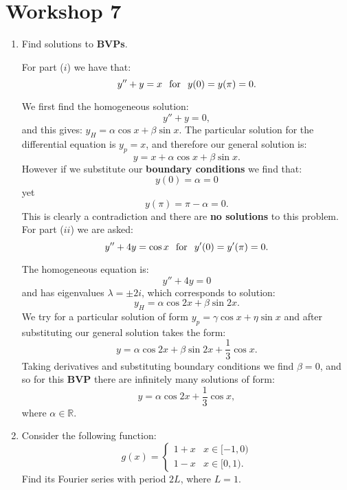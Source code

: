 \pagestyle{fancy}
\fancyhead{}

\section{Workshop 7}
\begin{enumerate}
    \item Find solutions to \textbf{BVPs}.

    For part ($i$) we have that:
    $$y''+y=x\hspace{0.1in}\text{for}\hspace{0.1in}y(0)=y(\pi)=0.$$
    
    We first find the homogeneous solution:
    $$y''+y=0,$$
    and this gives:
    $y_H=\alpha\cos x+\beta\sin x$. The particular solution for the differential equation is $y_p=x$, and therefore our general solution is:
    $$y=x+\alpha\cos x+\beta\sin x.$$
    However if we substitute our \textbf{boundary conditions} we find that:
    $$y(0)=\alpha=0$$
    yet
    $$y(\pi)=\pi-\alpha=0.$$
    This is clearly a contradiction and there are \textbf{no solutions} to this problem. \\

    For part ($ii$) we are asked:
    $$y''+4y=\cos x\hspace{0.1in}\text{for}\hspace{0.1in}y'(0)=y'(\pi)=0.$$

    The homogeneous equation is:
    $$y''+4y=0$$
    and has eigenvalues $\lambda=\pm 2i$, which corresponds to solution:
    $$y_H=\alpha\cos 2x+\beta\sin 2x.$$
    We try for a particular solution of form $y_p=\gamma\cos x+\eta\sin x$ and after substituting our general solution takes the form:
    $$y=\alpha\cos 2x+\beta\sin 2x+\frac{1}{3}\cos x.$$
    Taking derivatives and substituting boundary conditions we find $\beta=0$,
    and so for this \textbf{BVP} there are infinitely many solutions of form:
    $$y=\alpha\cos 2x+\frac{1}{3}\cos x,$$
    where $\alpha\in\mathbb{R}$.

    \newpage

    \item Consider the following function:
    $$g(x)=
    \left\{
    \begin{array}{ll}
        1+x  & \mbox{} x\in[-1,0) \\
        1-x & \mbox{} x\in[0,1).
    \end{array}
    \right.$$
    Find its Fourier series with period $2L$, where $L=1$. \\


\end{enumerate}
